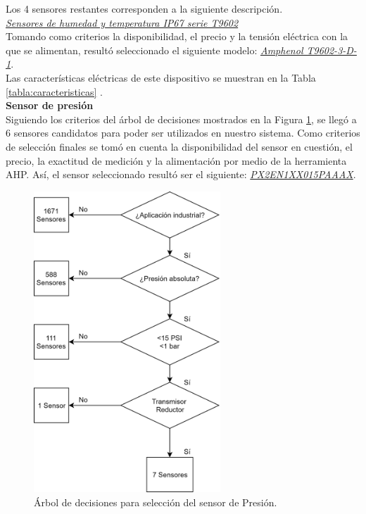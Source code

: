 Los 4 sensores restantes corresponden a la siguiente descripción.\\

\underline{\textit{Sensores de humedad y temperatura IP67 serie T9602}}\\

Tomando como criterios la disponibilidad, el precio y la tensión eléctrica con la que se alimentan, resultó seleccionado el siguiente modelo: \underline{\textit{Amphenol T9602-3-D-1}}. \\

Las características eléctricas de este dispositivo se muestran en la Tabla \ref{tabla:caracteristicas} \cite{DDEs1}. \\

\textbf{Sensor de presión}\\
Siguiendo los criterios del árbol de decisiones mostrados en la Figura \ref{fig:P1}, se llegó a 6 sensores candidatos para poder ser utilizados en nuestro sistema. Como criterios de selección finales se tomó en cuenta la disponibilidad del sensor en cuestión, el precio, la exactitud de medición y la alimentación por medio de la herramienta AHP. Así, el sensor seleccionado resultó ser el siguiente: \underline{\textit{PX2EN1XX015PAAAX}}.

\begin{figure}[H]
	\centering
	\includegraphics[width=7cm]{imagenes/P1}
	\caption{Árbol de decisiones para selección del sensor de Presión.}
	\label{fig:P1}
\end{figure}

